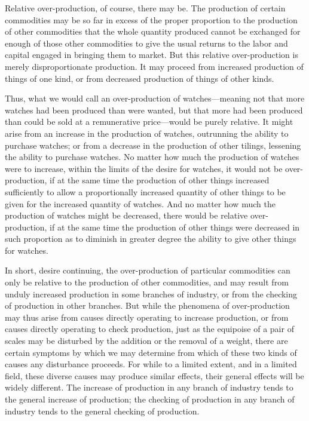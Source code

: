 \documentclass{book}
\begin{document}
Relative over-production, of course, there may be. The production of certain commodities may be so far in excess of the proper proportion to the production of other commodities that the whole quantity produced cannot be exchanged for enough of those other commodities to give the usual returns to the labor and capital engaged in bringing them to market. But this relative over-production is merely disproportionate production. It may proceed from increased production of things of one kind, or from decreased production of things of other kinds.

Thus, what we would call an over-production of watches—meaning not that more watches had been produced than were wanted, but that more had been produced than could be sold at a remunerative price—would be purely relative. It might arise from an increase in the production of watches, outrunning the ability to purchase watches; or from a decrease in the production of other tilings, lessening the ability to purchase watches. No matter how much the production of watches were to increase, within the limits of the desire for watches, it would not be over-production, if at the same time the production of other things increased sufficiently to allow a proportionally increased quantity of other things to be given for the increased quantity of watches. And no matter how much the production of watches might be decreased, there would be relative over-production, if at the same time the production of other things were decreased in such proportion as to diminish in greater degree the ability to give other things for watches.

In short, desire continuing, the over-production of particular commodities can only be relative to the production of other commodities, and may result from unduly increased production in some branches of industry, or from the checking of production in other branches. But while the phenomena of over-production may thus arise from causes directly operating to increase production, or from causes directly operating to check production, just as the equipoise of a pair of scales may be disturbed by the addition or the removal of a weight, there are certain symptoms by which we may determine from which of these two kinds of causes any disturbance proceeds. For while to a limited extent, and in a limited field, these diverse causes may produce similar effects, their general effects will be widely different. The increase of production in any branch of industry tends to the general increase of production; the checking of production in any branch of industry tends to the general checking of production.
\end{document}
